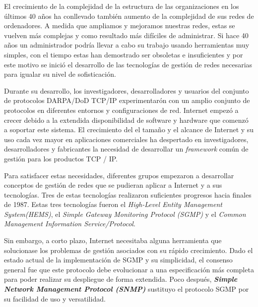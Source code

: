El crecimiento de la complejidad de la estructura de las organizaciones en los últimos 40 años ha 
conllevado también aumento de la complejidad de sus redes de ordenadores. A medida que ampliamos y 
mejoramos nuestras redes, estas se vuelven más complejas y como resultado más difíciles de 
administrar. Si hace 40 años un administrador podría llevar a cabo su trabajo usando herramientas 
muy simples, con el tiempo estas han demostrado ser obsoletas e insuficientes y por este motivo se 
inició el desarrollo de las tecnologías de gestión de redes necesarias para igualar su nivel de 
sofisticación.

Durante su desarrollo, los investigadores, desarrolladores y usuarios del conjunto de protocolos 
DARPA/DoD TCP/IP experimentarón con un amplio conjunto de protocolos en diferentes entornos y 
configuraciones de red. Internet empezó a crecer debido a la extendida disponibilidad de software
y hardware que comenzó a soportar este sistema. El crecimiento del el tamaño y el alcance de Internet
y su uso cada vez mayor en aplicaciones comerciales ha despertado en investigadores, desarrolladores y
fabricantes la necesidad de desarrollar un \textit{framework} común de gestión para los productos
TCP / IP.

Para satisfacer estas necesidades, diferentes grupos empezaron a desarrollar conceptos de gestión
de redes que se pudieran aplicar a Internet y a sus tecnologías. Tres de estas tecnologías realizaron
suficientes progresos hacia finales de 1987. Estas tres tecnologías fueron el \textit{High-Level Entity Management System(HEMS)}, el \textit{Simple
Gateway Monitoring Protocol (SGMP)} y el \textit{Common Management Information Service/Protocol}.

Sin embargo, a corto plazo, Internet necesitaba alguna herramienta que solucionase
los problemas de gestión asociados con su rápido crecimiento. Dado el estado actual de la implementación
de SGMP y su simplicidad, el consenso general fue que este protocolo debe evolucionar a una especificación
más completa para poder realizar su despliegue de forma extendida. Poco después, \textbf{\textit{Simple 
Network Management Protocol (SNMP) }} sustituyo el protocolo SGMP por su facilidad de uso y versatilidad.

